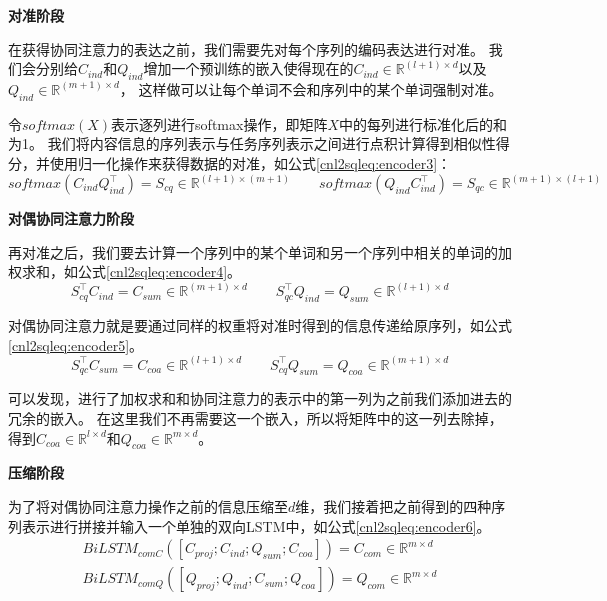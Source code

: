 \textbf{对准阶段}

在获得协同注意力的表达之前，我们需要先对每个序列的编码表达进行对准。
我们会分别给$C_{ind}$和$Q_{ind}$增加一个预训练的嵌入使得现在的$C_{ind} \in \mathbb{R}^{(l+1) \times d}$以及$Q_{ind} \in \mathbb{R}^{(m+1) \times d}$，
这样做可以让每个单词不会和序列中的某个单词强制对准。

令$softmax(X)$表示逐列进行softmax操作，即矩阵$X$中的每列进行标准化后的和为1。
我们将内容信息的序列表示与任务序列表示之间进行点积计算得到相似性得分，并使用归一化操作来获得数据的对准，如公式\ref{cnl2sqleq:encoder3}：
\begin{equation}
  \label{cnl2sqleq:encoder3}
  softmax(C_{ind}Q_{ind}^{\top}) = S_{cq} \in \mathbb{R}^{(l+1) \times (m+1)} \qquad softmax(Q_{ind}C_{ind}^{\top}) = S_{qc} \in \mathbb{R}^{(m+1) \times (l+1)}
\end{equation}

\textbf{对偶协同注意力阶段}

再对准之后，我们要去计算一个序列中的某个单词和另一个序列中相关的单词的加权求和，如公式\ref{cnl2sqleq:encoder4}。
\begin{equation}
  \label{cnl2sqleq:encoder4}
  S_{cq}^{\top}C_{ind} = C_{sum} \in \mathbb{R}^{(m+1) \times d} \qquad S_{qc}^{\top}Q_{ind} = Q_{sum} \in \mathbb{R}^{(l+1) \times d}
\end{equation}

对偶协同注意力就是要通过同样的权重将对准时得到的信息传递给原序列，如公式\ref{cnl2sqleq:encoder5}。
\begin{equation}
  \label{cnl2sqleq:encoder5}
  S_{qc}^{\top}C_{sum} = C_{coa} \in \mathbb{R}^{(l+1) \times d} \qquad S_{cq}^{\top}Q_{sum} = Q_{coa} \in \mathbb{R}^{(m+1) \times d}
\end{equation}

可以发现，进行了加权求和和协同注意力的表示中的第一列为之前我们添加进去的冗余的嵌入。
在这里我们不再需要这一个嵌入，所以将矩阵中的这一列去除掉，得到$C_{coa} \in \mathbb{R}^{l \times d}$和$Q_{coa} \in \mathbb{R}^{m \times d}$。

\textbf{压缩阶段}

为了将对偶协同注意力操作之前的信息压缩至$d$维，我们接着把之前得到的四种序列表示进行拼接并输入一个单独的双向LSTM中，如公式\ref{cnl2sqleq:encoder6}。
\begin{align}
  \label{cnl2sqleq:encoder6}
  BiLSTM_{comC}([C_{proj};C_{ind};Q_{sum};C_{coa}]) =  C_{com} \in \mathbb{R}^{m \times d}\\
  BiLSTM_{comQ}([Q_{proj};Q_{ind};C_{sum};Q_{coa}]) =  Q_{com} \in \mathbb{R}^{m \times d}
\end{align}

